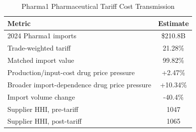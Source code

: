 \begin{table}[H]
\centering
\caption{Pharma1 Pharmaceutical Tariff Cost Transmission}
\label{tab:pharma1_price}
\begin{tabular}{lc}
\toprule
Metric & Estimate \\
\midrule
2024 Pharma1 imports & \$210.8B \\
Trade-weighted tariff & 21.28\% \\
Matched import value & 99.82\% \\
Production/input-cost drug price pressure & +2.47\% \\
Broader import-dependence drug price pressure & +10.34\% \\
Import volume change & -40.4\% \\
Supplier HHI, pre-tariff & 1047 \\
Supplier HHI, post-tariff & 1065 \\
\bottomrule
\end{tabular}
\end{table}
